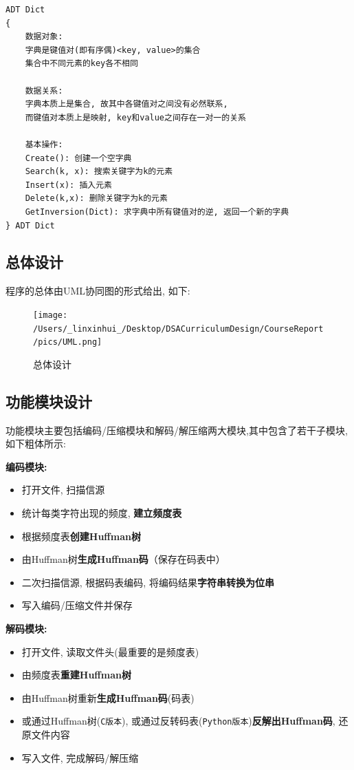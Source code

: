 \documentclass{ctexart}
\begin{document}
\begin{verbatim}
ADT Dict
{
    数据对象: 
    字典是键值对(即有序偶)<key, value>的集合
    集合中不同元素的key各不相同

    数据关系: 
    字典本质上是集合, 故其中各键值对之间没有必然联系, 
    而键值对本质上是映射, key和value之间存在一对一的关系

    基本操作:
    Create(): 创建一个空字典
    Search(k, x): 搜索关键字为k的元素
    Insert(x): 插入元素
    Delete(k,x): 删除关键字为k的元素
    GetInversion(Dict): 求字典中所有键值对的逆, 返回一个新的字典
} ADT Dict
\end{verbatim}

\subsection{总体设计}\label{header-n90}

程序的总体由UML协同图的形式给出, 如下:

\begin{figure}[H]
\centering
\texttt{[image: /Users/\_linxinhui\_/Desktop/DSACurriculumDesign/CourseReport/pics/UML.png]}
\caption{总体设计}
\end{figure}

\subsection{功能模块设计}\label{header-n93}

功能模块主要包括编码/压缩模块和解码/解压缩两大模块,其中包含了若干子模块, 如下粗体所示:

\textbf{编码模块:}

\begin{itemize}
\item
  打开文件, 扫描信源
\item
  统计每类字符出现的频度, \textbf{建立频度表}
\item
  根据频度表\textbf{创建Huffman树}
\item
  由Huffman树\textbf{生成Huffman码}（保存在码表中）
\item
  二次扫描信源, 根据码表编码, 将编码结果\textbf{字符串转换为位串}
\item
  写入编码/压缩文件并保存
\end{itemize}

\textbf{解码模块:}

\begin{itemize}
\item
  打开文件, 读取文件头(最重要的是频度表)
\item
  由频度表\textbf{重建Huffman树}
\item
  由Huffman树重新\textbf{生成Huffman码}(码表)
\item
  或通过Huffman树(\texttt{C版本}), 或通过反转码表(\texttt{Python版本})\textbf{反解出Huffman码}, 还原文件内容
\item
  写入文件, 完成解码/解压缩
\end{itemize}
\end{document}
